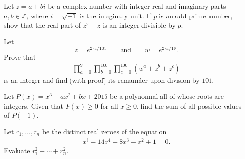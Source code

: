 %	




\begin{question}[name={2015 HMMT, Team, Problem 3}]
	Let $z=a+bi$ be a complex number with integer real and imaginary parts $a,b \in \mathbb Z$, where $i=\sqrt{-1}$ is the imaginary unit. If $p$ is an odd prime number, show that the real part of $z^p-z$ is an integer divisible by $p$.
\end{question}


%	



\begin{question}[name={2015 HMMT, Team, Problem 9}]
	Let $$z=e^{{2\pi i}/{101}} \qquad \text{and} \qquad  w=e^{{2\pi i}/{10}}.$$
	Prove that
	\begin{align*}
		\prod_{a=0}^{9}\prod_{b=0}^{100}\prod_{c=0}^{100} (w^a+z^b+z^c)
	\end{align*}
	is an integer and find (with proof) its remainder upon division by $101$.
\end{question}


%	






\begin{question}[name={2015 HMMT, Guts, Problem 13}]
	Let $P(x)=x^3+ax^2+bx+2015$ be a polynomial all of whose roots are integers. Given that $P(x) \geq 0$ for all $x\geq 0$, find the sum of all possible values of $P(-1)$.
\end{question}


%	





\begin{question}[name={2015 HMMT, Guts, Problem 25}]
	Let $r_1, \dots, r_n$ be the distinct real zeroes of the equation
	\begin{align*}
		x^8 - 14x^4 - 8x^3 - x^2 + 1 = 0.
	\end{align*}
	Evaluate $r_1^2+\cdots+r_n^2$.
\end{question}


